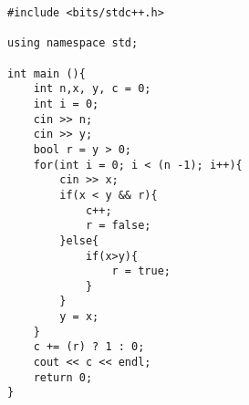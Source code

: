 \begin{verbatim}
#include <bits/stdc++.h>

using namespace std;

int main (){
	int n,x, y, c = 0;
	int i = 0;
	cin >> n;
	cin >> y;
	bool r = y > 0;
	for(int i = 0; i < (n -1); i++){
		cin >> x;
		if(x < y && r){
			c++;
			r = false;
		}else{
			if(x>y){
				r = true;
			}
		}
		y = x;
	}
	c += (r) ? 1 : 0;
	cout << c << endl;
	return 0;
}

\end{verbatim}
